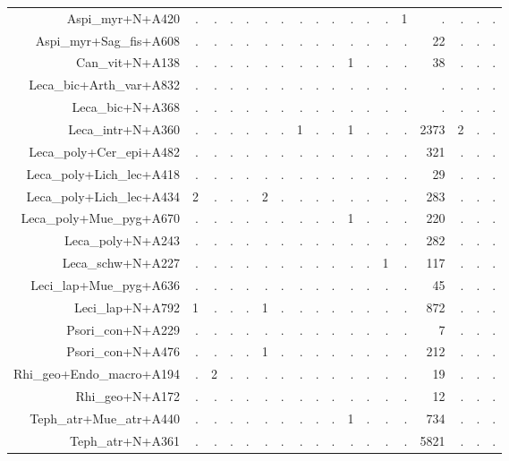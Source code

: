 \documentclass[a4paper, 11]{article}\usepackage[]{graphicx}\usepackage[]{color}
\begin{document}
\begin{table}
\begin{tabular}{rrrrrrrrrrrrrrrrrr}
  Aspi\_myr+N+A420 & . & . & . & . & . & . & . & . & . & . & . & . & 1 & . & . & . & . \\ 
  Aspi\_myr+Sag\_fis+A608 & . & . & . & . & . & . & . & . & . & . & . & . & . & 22 & . & . & . \\ 
  Can\_vit+N+A138 & . & . & . & . & . & . & . & . & . & 1 & . & . & . & 38 & . & . & . \\ 
  Leca\_bic+Arth\_var+A832 & . & . & . & . & . & . & . & . & . & . & . & . & . & . & . & . & . \\ 
  Leca\_bic+N+A368 & . & . & . & . & . & . & . & . & . & . & . & . & . & . & . & . & . \\ 
  Leca\_intr+N+A360 & . & . & . & . & . & . & 1 & . & . & 1 & . & . & . & 2373 & 2 & . & . \\ 
  Leca\_poly+Cer\_epi+A482 & . & . & . & . & . & . & . & . & . & . & . & . & . & 321 & . & . & . \\ 
  Leca\_poly+Lich\_lec+A418 & . & . & . & . & . & . & . & . & . & . & . & . & . & 29 & . & . & . \\ 
  Leca\_poly+Lich\_lec+A434 & 2 & . & . & . & 2 & . & . & . & . & . & . & . & . & 283 & . & . & . \\ 
  Leca\_poly+Mue\_pyg+A670 & . & . & . & . & . & . & . & . & . & 1 & . & . & . & 220 & . & . & . \\ 
  Leca\_poly+N+A243 & . & . & . & . & . & . & . & . & . & . & . & . & . & 282 & . & . & . \\ 
  Leca\_schw+N+A227 & . & . & . & . & . & . & . & . & . & . & . & 1 & . & 117 & . & . & . \\ 
  Leci\_lap+Mue\_pyg+A636 & . & . & . & . & . & . & . & . & . & . & . & . & . & 45 & . & . & . \\ 
  Leci\_lap+N+A792 & 1 & . & . & . & 1 & . & . & . & . & . & . & . & . & 872 & . & . & . \\ 
  Psori\_con+N+A229 & . & . & . & . & . & . & . & . & . & . & . & . & . & 7 & . & . & . \\ 
  Psori\_con+N+A476 & . & . & . & . & 1 & . & . & . & . & . & . & . & . & 212 & . & . & . \\ 
  Rhi\_geo+Endo\_macro+A194 & . & 2 & . & . & . & . & . & . & . & . & . & . & . & 19 & . & . & . \\ 
  Rhi\_geo+N+A172 & . & . & . & . & . & . & . & . & . & . & . & . & . & 12 & . & . & . \\ 
  Teph\_atr+Mue\_atr+A440 & . & . & . & . & . & . & . & . & . & 1 & . & . & . & 734 & . & . & . \\ 
  Teph\_atr+N+A361 & . & . & . & . & . & . & . & . & . & . & . & . & . & 5821 & . & . & . \\ 

\end{tabular}
\end{table}
\end{document}
